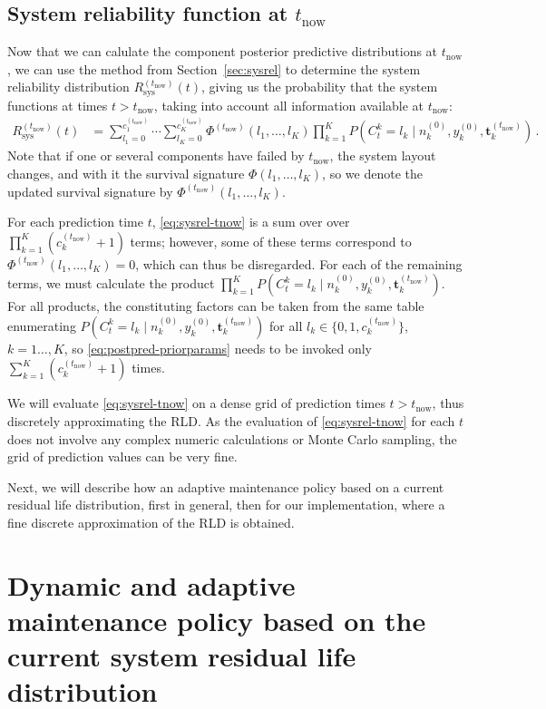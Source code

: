 \documentclass[authoryear]{elsarticle}
\renewcommand{\vec}[1]{{\bm#1}}
\newcommand{\uz}{^{(0)}} %
\def\ykz{y\uz_k}
\def\nkz{n\uz_k}
\def\tnow{t_\text{now}}
\newcommand{\Rsysnow}{R^{(t_\text{now})}_\text{sys}}
\def\cknow{c_k^{(\tnow)}}
\def\vectknow{\vec{t}_k^{(\tnow)}}
\def\Phinow{\Phi^{(\tnow)}}
\begin{document}
\subsection{System reliability function at $\tnow$}
\label{sec:sysreltnow}

Now that we can calulate the component posterior predictive distributions at $\tnow$,
we can use the method from Section~\ref{sec:sysrel}
to determine the system reliability distribution $\Rsysnow(t)$,
giving us the probability that the system functions at times $t > \tnow$,
taking into account all information available at $\tnow$:
\begin{align}
\Rsysnow(t) &= \sum_{l_1=0}^{c_1^{(\tnow)}} \cdots \sum_{l_K=0}^{c_K^{(\tnow)}} \Phinow(l_1,\ldots,l_K)
               \prod_{k=1}^K P(C^k_t = l_k\mid\nkz,\ykz, \vectknow)\,.
\label{eq:sysrel-tnow}
\end{align}
Note that if one or several components have failed by $\tnow$,
the system layout changes, and with it the survival signature $\Phi(l_1,\ldots,l_K)$,
so we denote the updated survival signature by $\Phinow(l_1,\ldots,l_K)$.

For each prediction time $t$,
\eqref{eq:sysrel-tnow} is a sum over over $\prod_{k=1}^K (\cknow + 1)$ terms;
however, some of these terms correspond to $\Phinow(l_1,\ldots,l_K) = 0$,
which can thus be disregarded.
For each of the remaining terms,
we must calculate the product $\prod_{k=1}^K P(C^k_t = l_k\mid\nkz,\ykz, \vectknow)$.
For all products, the constituting factors can be taken from the same table
enumerating $P(C^k_t = l_k\mid\nkz,\ykz, \vectknow)$ for all $l_k \in \{0, 1, \cknow\}$, $k=1\ldots,K$,
so \eqref{eq:postpred-priorparams} needs to be invoked 
only $\sum_{k=1}^K (\cknow + 1)$ times.

We will evaluate \eqref{eq:sysrel-tnow} on a dense grid of prediction times $t > \tnow$,
thus discretely approximating the RLD.
As the evaluation of \eqref{eq:sysrel-tnow} for each $t$ does not involve any complex numeric calculations or Monte Carlo sampling,
the grid of prediction values can be very fine.

Next, we will describe how an adaptive maintenance policy based on %
a current residual life distribution,
first in general, then for our implementation,
where a fine discrete approximation of the RLD is obtained.


\section{Dynamic and adaptive maintenance policy based on the current system residual life distribution}
\label{sec:policy}
\end{document}
